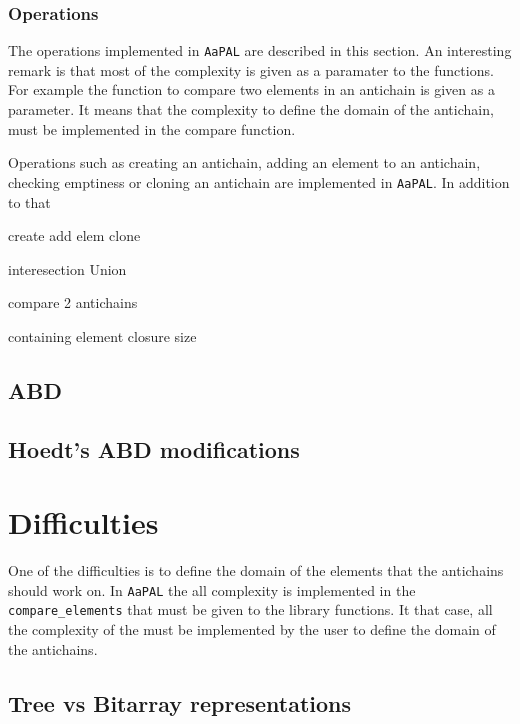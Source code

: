 \documentclass[letterpaper]{memoir}
\begin{document}
\subsubsection{Operations}

The operations implemented in \texttt{AaPAL}
are described in this section.
An interesting remark is that most of the complexity is given as a paramater
to the functions. For example the function to compare two elements in
an antichain is given as a parameter. It means that the complexity to define
the domain of the antichain, must be implemented in the compare function.

Operations such as creating an antichain,
adding an element to
an antichain, checking emptiness or cloning an antichain are implemented
in \texttt{AaPAL}. In addition to that

create
add elem
clone

interesection
Union

compare 2 antichains

containing element
closure size



\subsection{ABD}

\subsection{Hoedt's ABD modifications}



\section{Difficulties}


One of the difficulties is to define the domain of the elements that
the antichains should work on. In \texttt{AaPAL} the all complexity
is implemented in the \texttt{compare\_elements} that must be given
to the library functions. It that case, all the complexity of the
must be implemented by the user to define the domain of the antichains.

\subsection{Tree vs Bitarray representations}
\end{document}
